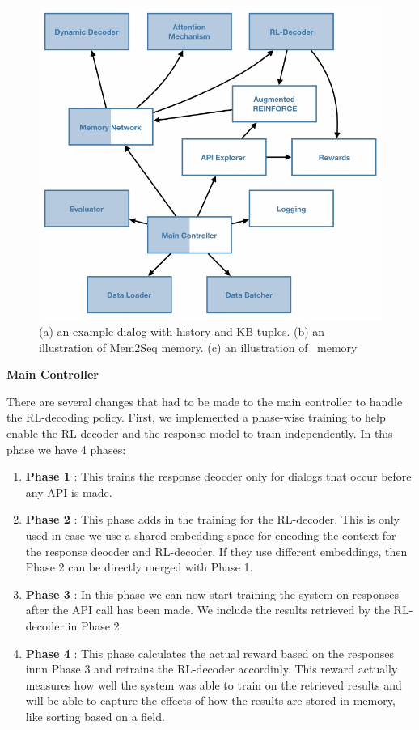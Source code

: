 \begin{figure}[t]
\centering
\includegraphics[scale=1.2]{assets/figures/rl_components.pdf}
\caption{(a) an example dialog with history and KB tuples. (b) an illustration of Mem2Seq memory. (c) an illustration of \sys\ memory}
\label{fig:sys_comp_rl}
\end{figure}

\noindent\textbf{Main Controller}

There are several changes that had to be made to the main controller to handle the RL-decoding policy. First, we implemented a phase-wise training to help enable the RL-decoder and the response model to train independently. In this phase we have 4 phases:
\begin{enumerate}
	\item \textbf{Phase 1} : This trains the response deocder only for dialogs that occur before any API is made.
	\item \textbf{Phase 2} : This phase adds in the training for the RL-decoder. This is only used in case we use a shared embedding space for encoding the context for the response deocder and RL-decoder. If they use different embeddings, then Phase 2 can be directly merged with Phase 1.
	\item \textbf{Phase 3} : In this phase we can now start training the system on responses after the API call has been made. We include the results retrieved by the RL-decoder in Phase 2.
	\item \textbf{Phase 4} : This phase calculates the actual reward based on the responses innn Phase 3 and retrains the RL-decoder accordinly. This reward actually measures how well the system was able to train on the retrieved results and will be able to capture the effects of how the results are stored in memory, like sorting based on a field.
\end{enumerate}

